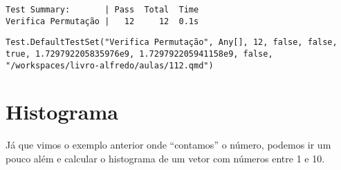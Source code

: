 \documentclass[
  letterpaper,
  DIV=11,
  numbers=noendperiod]{scrreprt}
\begin{document}
\begin{verbatim}
Test Summary:       | Pass  Total  Time
Verifica Permutação |   12     12  0.1s
\end{verbatim}

\begin{verbatim}
Test.DefaultTestSet("Verifica Permutação", Any[], 12, false, false, true, 1.729792205835976e9, 1.729792205941158e9, false, "/workspaces/livro-alfredo/aulas/112.qmd")
\end{verbatim}

\section{Histograma}\label{histograma}

Já que vimos o exemplo anterior onde ``contamos'' o número, podemos ir
um pouco além e calcular o histograma de um vetor com números entre 1 e
10.
\end{document}
